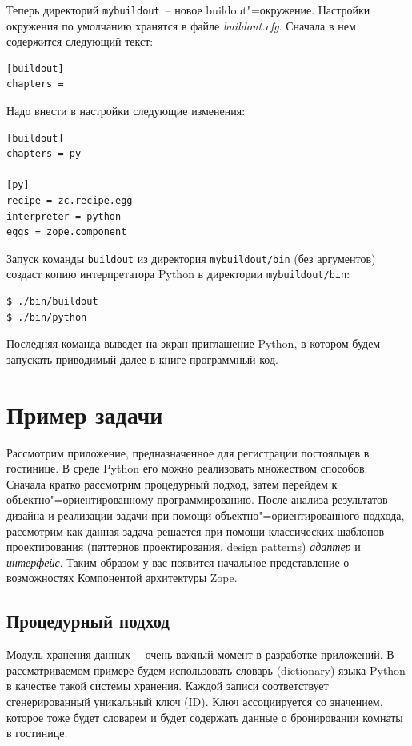 \documentclass[a4paper,openany,twoside,final]{book}
\providecommand*{\DUroletitlereference}[1]{\textsl{#1}}
\begin{document}
Теперь директорий \texttt{mybuildout}~-- новое buildout"=окружение.  Настройки окружения по умолчанию хранятся в файле \DUroletitlereference{buildout.cfg}.  Сначала в нем содержится следующий текст:

\begin{verbatim}
[buildout]
chapters =
\end{verbatim}

Надо внести в настройки следующие изменения:

\begin{verbatim}
[buildout]
chapters = py

[py]
recipe = zc.recipe.egg
interpreter = python
eggs = zope.component
\end{verbatim}

Запуск команды \texttt{buildout} из директория \texttt{mybuildout/bin} (без аргументов) создаст копию интерпретатора Python в директории \texttt{mybuildout/bin}:

\begin{verbatim}
$ ./bin/buildout
$ ./bin/python
\end{verbatim}

Последняя команда выведет на экран приглашение Python, в котором будем запускать приводимый далее в книге программный код.


\chapter{Пример задачи%
  \label{id17}%
}


Рассмотрим приложение, предназначенное для регистрации постояльцев в гостинице.  В среде Python его можно реализовать множеством способов.  Сначала кратко рассмотрим процедурный подход, затем перейдем к объектно"=ориентированному программированию.  После анализа результатов дизайна и реализации задачи при помощи объектно"=ориентированного подхода, рассмотрим как данная задача решается при помощи классических шаблонов проектирования (паттернов проектирования, design patterns) \DUroletitlereference{адаптер} и \DUroletitlereference{интерфейс}.  Таким образом у вас появится начальное представление о возможностях Компонентой архитектуры Zope.


\section{Процедурный подход%
  \label{id19}%
}

Модуль хранения данных~-- очень важный момент в разработке приложений.  В рассматриваемом примере будем использовать словарь (dictionary) языка Python в качестве такой системы хранения.  Каждой записи соответствует сгенерированный уникальный ключ (ID).  Ключ ассоциируется со значением, которое тоже будет словарем и будет содержать данные о бронировании комнаты в гостинице.
\end{document}
